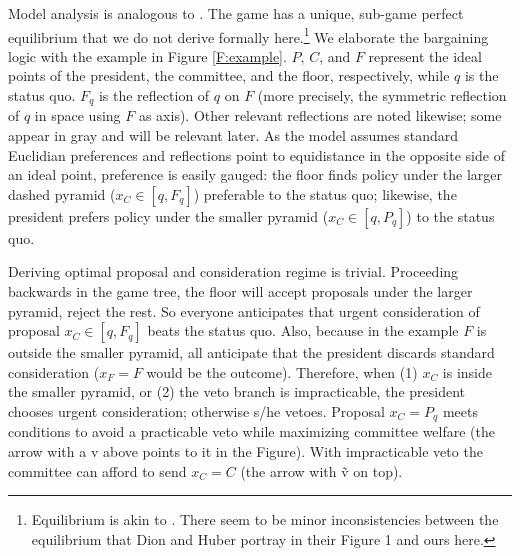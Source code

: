 \documentclass[letter,12pt]{article}
\begin{document}
Model analysis is analogous to \citet{dion.huber.1996}. The game has a unique, sub-game perfect equilibrium that we do not derive formally here.\footnote{Equilibrium is akin to \citet{magar.nd,romer.rosenthal.1978,cox.mccubbins.2005,gerber.1996}. There seem to be minor inconsistencies between the equilibrium that Dion and Huber portray in their Figure 1 and ours here.} We elaborate the bargaining logic with the example in Figure \ref{F:example}. $P$, $C$, and $F$ represent the ideal points of the president, the committee, and the floor, respectively, while $q$ is the status quo. $F_q$ is the reflection of $q$ on $F$ (more precisely, the symmetric reflection of $q$ in space using $F$ as axis). Other relevant reflections are noted likewise; some appear in gray and will be relevant later. As the model assumes standard Euclidian preferences and reflections point to equidistance in the opposite side of an ideal point, preference is easily gauged: the floor finds policy under the larger dashed pyramid ($x_C \in [q,F_q]$) preferable to the status quo; likewise, the president prefers policy under the smaller pyramid ($x_C \in [q,P_q]$) to the status quo. 

Deriving optimal proposal and consideration regime is trivial. Proceeding backwards in the game tree, the floor will accept proposals under the larger pyramid, reject the rest. So everyone anticipates that urgent consideration of proposal $x_C \in [q,F_q]$ beats the status quo. Also, because in the example $F$ is outside the smaller pyramid, all anticipate that the president discards standard consideration ($x_F=F$ would be the outcome). Therefore, when (1) $x_C$ is inside the smaller pyramid, or (2) the veto branch is impracticable, the president chooses urgent consideration; otherwise s/he vetoes. Proposal $x_C=P_q$ meets conditions to avoid a practicable veto while maximizing committee welfare (the arrow with a v above points to it in the Figure). With impracticable veto the committee can afford to send $x_C=C$ (the arrow with \~v on top).
\end{document}
